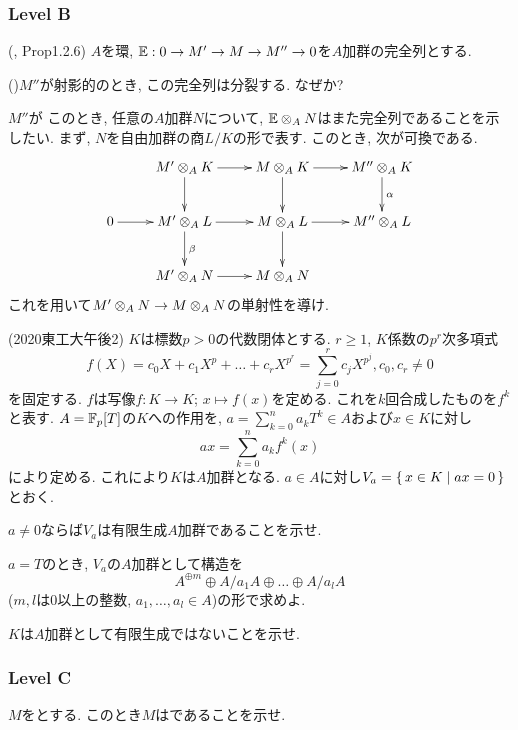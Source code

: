 \subsubsection{Level B}
\begin{prob} (\cite{liu}, Prop1.2.6)
$A$を環, $\mathbb{E}: 0\to M'\to M \to M'' \to 0$を$A$加群の完全列とする.
\ben
\item ()$M''$が射影的のとき, この完全列は分裂する. なぜか?
\item $M''$が このとき, 任意の$A$加群$N$について, $\mathbb{E}\mathbin{\otimes}_{A}N$はまた完全列であることを示したい. まず, $N$を自由加群の商$L/K$の形で表す. このとき, 次が可換である.
\[
\xymatrix{
 &M'\tens_{A}K\ar[r]\ar[d]& M\tens_{A}K\ar[r]\ar[d] &M''\tens_{A}K\ar[d]^{\alpha} \\
 0\ar[r]&M'\tens_{A}L\ar[r]\ar[d]^{\beta}&M\tens_{A}L\ar[r]\ar[d]& M''\tens_{A}L\\
  & M'\tens_{A}N \ar[r] & M\tens_{A}N
}
\]
これを用いて$M'\mathbin{\otimes}_{A}N \to M\mathbin{\otimes}_{A}N$の単射性を導け.
\een
\end{prob}

\begin{prob} (2020東工大午後2)
$K$は標数$p>0$の代数閉体とする. $r\geq 1$, $K$係数の$p^r$次多項式
\[f(X) = c_0X + c_1X^p + \dots + c_rX^{p^r} = \sum_{j=0}^{r} c_jX^{p^j}, c_0,c_r\neq 0\]
を固定する. $f$は写像$f:K\to K$; $x\mapsto f(x)$を定める. これを$k$回合成したものを$f^k$と表す. $A=\mathbb{F}_{p}[T]$の$K$への作用を, $a=\sum_{k=0}^{n} a_kT^k\in A$および$x\in K$に対し
\[ax = \sum_{k=0}^{n} a_kf^k(x)\]
により定める. これにより$K$は$A$加群となる. $a\in A$に対し$V_a = \set{x\in K\mid ax = 0}$とおく.
\ben
\item $a\neq 0$ならば$V_a$は有限生成$A$加群であることを示せ.
\item $a=T$のとき, $V_a$の$A$加群として構造を
\[A^{\oplus m}\oplus A/a_1A \oplus \dots \oplus A/a_lA\]
($m,l$は0以上の整数, $a_1,\dots, a_l\in A$)の形で求めよ.
\item $K$は$A$加群として有限生成ではないことを示せ.
\een
\end{prob}


\subsubsection{Level C}

\begin{prob}
$M$をとする. このとき$M$はであることを示せ.
\end{prob}

